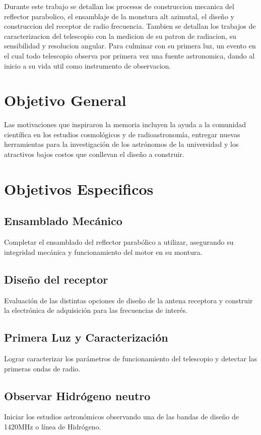 Durante este trabajo se detallan los procesos de construccion mecanica del reflector parabolico, el ensamblaje de la monstura alt azimutal, el diseño y construccion del receptor de radio frecuencia. Tambien se detallan los trabajos de caracterizacion del telescopio con la medicion de su patron de radiacion, su sensibilidad y resolucion angular. Para culminar con su primera luz, un evento en el cual todo telescopio observa por primera vez una fuente astronomica, dando al inicio a su vida util como instrumento de observacion.\\


\section{Objetivo General}
Las motivaciones que inspiraron la memoria incluyen la ayuda a la comunidad científica en los estudios cosmológicos y de radioastronomía, entregar nuevas herramientas para la investigación de los astrónomos de la universidad y los atractivos bajos costos que conllevan el diseño a construir.
\section{Objetivos Especificos}
\subsection{Ensamblado Mecánico}

Completar el ensamblado del reflector parabólico a utilizar, asegurando su integridad mecánica y funcionamiento del motor en su montura.

\subsection{Diseño del receptor}

Evaluación de las distintas opciones de diseño de la antena receptora y construir la electrónica de adquisición para las frecuencias de interés.

\subsection{Primera Luz y Caracterización}

Lograr caracterizar los parámetros de funcionamiento del telescopio y detectar las primeras ondas de radio.

\subsection{Observar Hidrógeno neutro}


Iniciar los estudios astronómicos observando una de las bandas de diseño de 1420MHz o línea de Hidrógeno.